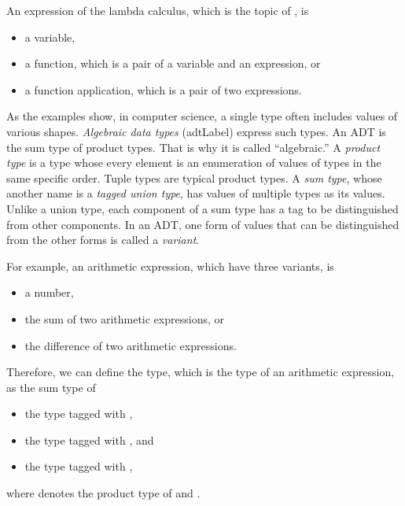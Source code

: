 An expression of the lambda calculus, which is the topic of
, is

\begin{itemize}
\item a variable,
\item a function, which is a pair of a variable and an expression, or
\item a function application, which is a pair of two expressions.
\end{itemize}

As the examples show, in computer science, a single type often includes values of
various shapes. \textit{Algebraic data types}
(\acrshort{adtLabel}) express such types. An ADT
is the sum type of product types. That is why it is called ``algebraic.''
A \textit{product type}
is a type whose every element is an enumeration of values of types in the
same specific order. Tuple types are typical product types. A \textit{sum
type}, whose
another name is a \textit{tagged union type},
has values of multiple types as its values. Unlike a union type,
each component of a sum type has a
tag to be distinguished from other components.
In an ADT, one form of values that can be distinguished from the other forms is
called a \textit{variant}.

For example, an arithmetic expression, which have three variants, is

\begin{itemize}
\item a number,
\item the sum of two arithmetic expressions, or
\item the difference of two arithmetic expressions.
\end{itemize}

Therefore, we can define the  type, which is the type of an arithmetic
expression, as the sum type of

\begin{itemize}
\item the  type tagged with ,
\item the  type tagged with , and
\item the  type tagged with ,
\end{itemize}

where  denotes the product type of  and .

